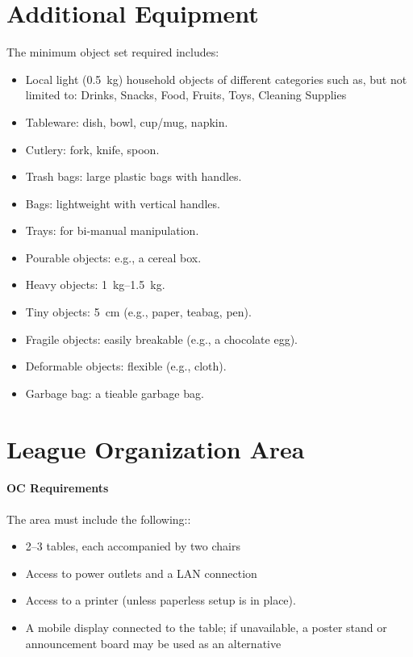 \section{Additional Equipment}
The minimum object set required includes:
\begin{itemize}
    \item Local light (\qty{0.5}{\kilogram}) household objects of different categories such as, but not limited to: Drinks, Snacks, Food, Fruits, Toys, Cleaning Supplies
    \item Tableware: dish, bowl, cup/mug, napkin.
    \item Cutlery: fork, knife, spoon.
    \item Trash bags: large plastic bags with handles.
    \item Bags: lightweight with vertical handles.
    \item Trays: for bi-manual manipulation.
    \item Pourable objects: e.g., a cereal box.
    \item Heavy objects: \qtyrange{1}{1.5}{\kilogram}.
    \item Tiny objects: \qty{5}{\centi\meter} (e.g., paper, teabag, pen).
    \item Fragile objects: easily breakable (e.g., a chocolate egg).
    \item Deformable objects: flexible (e.g., cloth).
    \item Garbage bag: a tieable garbage bag.
\end{itemize}

\section{League Organization Area}
\paragraph{OC Requirements} The \OC{} area must include the following::
\begin{itemize}
    \item \numrange{2}{3} tables, each accompanied by two chairs
    \item Access to power outlets and a LAN connection
    \item Access to a printer (unless paperless setup is in place).
    \item A mobile display connected to the table; if unavailable, a poster stand or announcement board may be used as an alternative
\end{itemize}

